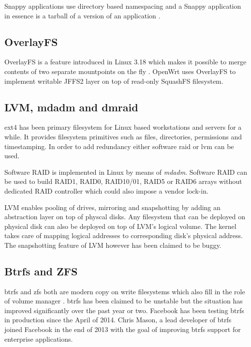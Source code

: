 \documentclass[a4paper,11pt]{kth-mag}
\begin{document}
Snappy applications use directory based namespacing
and a Snappy application in essence is a tarball of a version
of an application \cite{ubuntu}.


\subsection{OverlayFS}

OverlayFS is a feature introduced in Linux 3.18 which makes it
possible to merge contents of two separate mountpoints on the fly \cite{overlayfs}.
OpenWrt uses OverlayFS to implement writable JFFS2 layer on top of
read-only SquashFS filesystem.

\subsection{LVM, mdadm and dmraid}

\acrshort{ext4} has been primary filesystem for Linux based workstations and
servers for a while. It provides filesystem primitives such as files,
directories, permissions and timestamping.
In order to add redundancy
either software \acrfull{raid} or \acrfull{lvm} can be used.

Software RAID is implemented in Linux by means of \emph{mdadm}.
Software RAID can be used to build RAID1, RAID0, RAID10/01, RAID5
or RAID6 arrays without dedicated RAID controller which could also
impose a vendor lock-in.

LVM enables pooling of drives, mirroring and snapshotting by adding
an abstraction layer on top of physcal disks. Any filesystem that
can be deployed on physical disk can also be deployed on top of
LVM's logical volume. The kernel takes care of mapping logical
addresses to corresponding disk's physical address.
The snapshotting feature of LVM however has been claimed to be buggy.
\cite{fedora-and-lvm}


\subsection{Btrfs and ZFS}

\acrshort{btrfs} and \acrfull{zfs} both are modern copy on write filesystems
which also fill in the role of volume manager
\cite{btrfs-the-linux-b-tree-filesystem}
\cite{chris-mason-the-btrfs-filesystem}.
\acrshort{btrfs} has been claimed to be unstable but the situation has
improved significantly over the past year or two.
Facebook has been testing \acrshort{btrfs} in production since the April of 2014.
\cite{btrfs-production-users}
Chris Mason, a lead developer of \acrshort{btrfs} joined Facebook
in the end of 2013 with the goal of improving \acrshort{btrfs} support
for enterprise applications.
\cite{leaving-fusionio}
\end{document}
